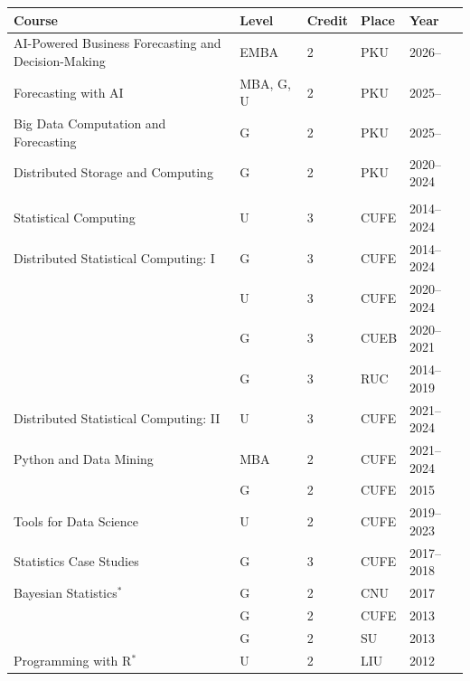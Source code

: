 \documentclass[twoside,a4paper]{article}
\begin{document}
\begin{center}
  \begin{tabular}{p{7.5cm}llll}
    \toprule
    Course                                & Level      & Credit & Place & Year       \\
    \midrule
    AI-Powered Business Forecasting and Decision-Making & EMBA   & 2      & PKU   & 2026--     \\
    Forecasting with AI                   & MBA, G, U & 2      & PKU   & 2025--     \\
    Big Data Computation and Forecasting  & G          & 2      & PKU   & 2025--     \\
    Distributed Storage and Computing     & G          & 2      & PKU   & 2020--2024 \\
                                          &            &        &       &            \\
    Statistical Computing                 & U          & 3      & CUFE  & 2014--2024 \\
    Distributed Statistical Computing: I  & G          & 3      & CUFE  & 2014--2024 \\
                                          & U          & 3      & CUFE  & 2020--2024 \\
                                          & G          & 3      & CUEB  & 2020--2021 \\
                                          & G          & 3      & RUC   & 2014--2019 \\
    Distributed Statistical Computing: II & U          & 3      & CUFE  & 2021--2024 \\
    Python and Data Mining                & MBA        & 2      & CUFE  & 2021--2024 \\
                                          & G          & 2      & CUFE  & 2015       \\
    Tools for Data Science                & U          & 2      & CUFE  & 2019--2023 \\
    Statistics Case Studies               & G          & 3      & CUFE  & 2017--2018 \\
    Bayesian Statistics$^*$               & G          & 2      & CNU   & 2017       \\
                                          & G          & 2      & CUFE  & 2013       \\
                                          & G          & 2      & SU    & 2013       \\
    Programming with R$^*$                & U          & 2      & LIU   & 2012       \\

\end{tabular}
\end{center}
\end{document}
